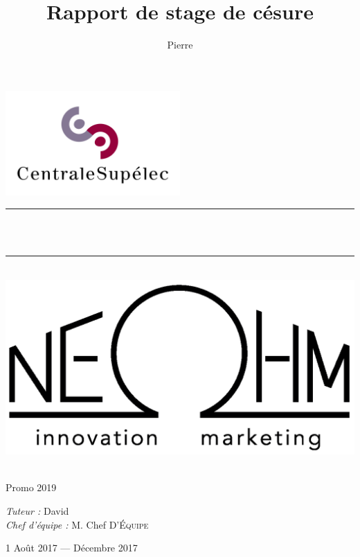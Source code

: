 \documentclass[a4paper, 11pt]{report}
\title{Rapport de stage de césure}
\author{Pierre \bsc{Gintrand}}
\newcommand{\HRule}{\rule{\linewidth}{0.5mm}}
\begin{document}
\makeatletter %
\begin{titlepage}
\begin{center}


\includegraphics[width=0.5\textwidth]{figures/logos/centralesupelec_logo.png}~\\[3cm]

\HRule \\[0.4cm]
{ \huge \bfseries \@title \\[0.4cm] }

\HRule \\[2cm]

\includegraphics[scale=0.3]{figures/logos/neohm_logo.png}\\[3cm]

\begin{minipage}{0.4\textwidth}
  \begin{flushleft} \large
    \@author\\
    Promo 2019\\
  \end{flushleft}
\end{minipage}
\begin{minipage}{0.4\textwidth}
  \begin{flushright} \large
    \emph{Tuteur :} David \\
    \emph{Chef d'équipe : } M. Chef \textsc{D’Équipe}
  \end{flushright}
\end{minipage}

\vfill

{\large 1\ier{} Août 2017 — Décembre 2017}

\end{center}
\end{titlepage}
\makeatother %
\end{document}
